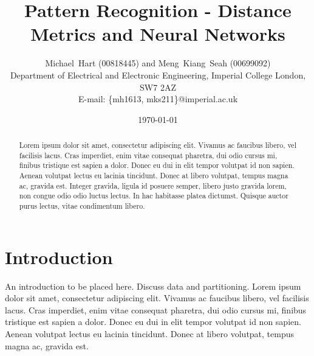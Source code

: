 \documentclass[a4paper, 10pt, conference]{ieeeconf}
\begin{document}
\title{Pattern Recognition - Distance Metrics and Neural Networks}
\author{Michael~Hart (00818445) and
        Meng~Kiang~Seah (00699092)
\\
        Department of Electrical and Electronic Engineering,
        Imperial College London,
        SW7 2AZ
\\
        E-mail: \{mh1613, mks211\}@imperial.ac.uk}
\date{\today}




\maketitle


\begin{abstract}
 Lorem ipsum dolor sit amet, consectetur adipiscing elit. Vivamus ac faucibus libero, vel facilisis lacus. Cras imperdiet, enim vitae consequat pharetra, dui odio cursus mi, finibus tristique est sapien a dolor. Donec eu dui in elit tempor volutpat id non sapien. Aenean volutpat lectus eu lacinia tincidunt. Donec at libero volutpat, tempus magna ac, gravida est. Integer gravida, ligula id posuere semper, libero justo gravida lorem, non congue odio odio luctus lectus. In hac habitasse platea dictumst. Quisque auctor purus lectus, vitae condimentum libero.
\end{abstract}

\section{Introduction}
An introduction to be placed here. Discuss data and partitioning. Lorem ipsum dolor sit amet, consectetur adipiscing elit. Vivamus ac faucibus libero, vel facilisis lacus. Cras imperdiet, enim vitae consequat pharetra, dui odio cursus mi, finibus tristique est sapien a dolor. Donec eu dui in elit tempor volutpat id non sapien. Aenean volutpat lectus eu lacinia tincidunt. Donec at libero volutpat, tempus magna ac, gravida est.
\end{document}
